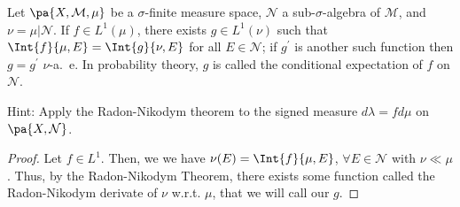 \documentclass[12pt,letterpaper,twoside]{hmcpset}
\begin{document}
\begin{problem}[6]
Let $\pa{X,\mathcal{M},\mu}$ be a $\sigma$-finite measure space, $\mathcal{N}$ a sub-$\sigma$-algebra of $\mathcal{M}$, and $\nu = \mu|\mathcal{N}$.  If $f \in L^1(\mu)$, there exists $g \in L^1(\nu)$ such that $\Int{f}{\mu,E} = \Int{g}{\nu,E}$ for all $E \in \mathcal{N}$; if $g^\prime$ is another such function then $g=g^\prime$ $\nu$-a.\ e. In probability theory, $g$ is called the conditional expectation of $f$ on $\mathcal{N}$.

Hint:  Apply the Radon-Nikodym theorem to the signed measure $d\lambda = fd\mu$ on $\pa{X,\mathcal{N}}$.
\end{problem}

\begin{solution}
 \begin{proof}
  Let $f \in L^1$.  Then, we we have $\nu(E) = \Int{f}{\mu,E}$, $\forall E \in \mathcal{N}$ with $\nu \ll \mu$.  Thus, by the Radon-Nikodym Theorem, there exists some function called the Radon-Nikodym derivate of $\nu$ w.r.t. $\mu$, that we will call our $g$.
 \end{proof}

\end{solution}
\end{document}
